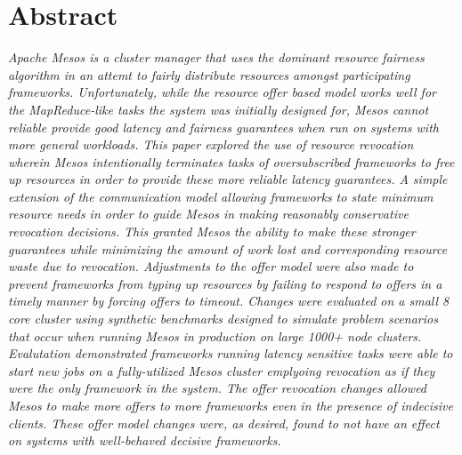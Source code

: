 \section{Abstract}
\textit{
Apache Mesos is a cluster manager that uses the dominant resource fairness algorithm in an
attemt to fairly distribute resources amongst participating frameworks. Unfortunately, while
the resource offer based model works well for the MapReduce-like tasks the system was initially
designed for, Mesos cannot reliable provide good latency and fairness guarantees when run on
systems with more general workloads. This paper explored the use of resource revocation wherein
Mesos intentionally terminates tasks of oversubscribed frameworks to free up resources in order
to provide these more reliable latency guarantees. A simple extension of the communication
model allowing frameworks to state minimum resource needs in order to guide Mesos in making
reasonably conservative revocation decisions. This granted Mesos the ability to make these
stronger guarantees while minimizing the amount of work lost and corresponding resource waste
due to revocation. Adjustments to the offer model were also made to prevent frameworks from
typing up resources by failing to respond to offers in a timely manner by forcing offers to
timeout. Changes were evaluated on a small 8 core cluster using synthetic benchmarks
designed to simulate problem scenarios that occur when running Mesos in production on large
1000+ node clusters. Evalutation demonstrated frameworks running latency sensitive tasks were able to
start new jobs on a fully-utilized Mesos cluster emplyoing revocation as if they were the only
framework in the system. The offer revocation changes allowed Mesos to make more offers to more
frameworks even in the presence of indecisive clients. These offer model changes were, as
desired, found to not have an effect on systems with well-behaved decisive frameworks.
}
